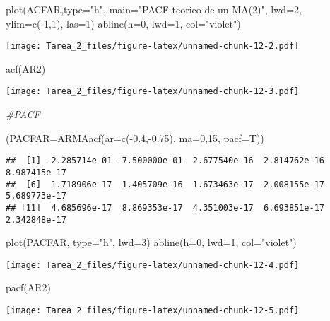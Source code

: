 \documentclass[
]{article}
\newenvironment{Shaded}{\begin{snugshade}}{\end{snugshade}}
\newcommand{\AttributeTok}[1]{\textcolor[rgb]{0.77,0.63,0.00}{#1}}
\newcommand{\CommentTok}[1]{\textcolor[rgb]{0.56,0.35,0.01}{\textit{#1}}}
\newcommand{\DecValTok}[1]{\textcolor[rgb]{0.00,0.00,0.81}{#1}}
\newcommand{\FloatTok}[1]{\textcolor[rgb]{0.00,0.00,0.81}{#1}}
\newcommand{\FunctionTok}[1]{\textcolor[rgb]{0.00,0.00,0.00}{#1}}
\newcommand{\NormalTok}[1]{#1}
\newcommand{\SpecialCharTok}[1]{\textcolor[rgb]{0.00,0.00,0.00}{#1}}
\newcommand{\StringTok}[1]{\textcolor[rgb]{0.31,0.60,0.02}{#1}}
\begin{document}
\begin{Shaded}
\begin{Highlighting}[]
\FunctionTok{plot}\NormalTok{(ACFAR,}\AttributeTok{type=}\StringTok{"h"}\NormalTok{, }\AttributeTok{main=}\StringTok{"PACF teorico de un MA(2)"}\NormalTok{, }\AttributeTok{lwd=}\DecValTok{2}\NormalTok{, }\AttributeTok{ylim=}\FunctionTok{c}\NormalTok{(}\SpecialCharTok{{-}}\DecValTok{1}\NormalTok{,}\DecValTok{1}\NormalTok{), }\AttributeTok{las=}\DecValTok{1}\NormalTok{)}
\FunctionTok{abline}\NormalTok{(}\AttributeTok{h=}\DecValTok{0}\NormalTok{, }\AttributeTok{lwd=}\DecValTok{1}\NormalTok{, }\AttributeTok{col=}\StringTok{"violet"}\NormalTok{)}
\end{Highlighting}
\end{Shaded}

\texttt{[image: Tarea\_2\_files/figure-latex/unnamed-chunk-12-2.pdf]}

\begin{Shaded}
\begin{Highlighting}[]
\FunctionTok{acf}\NormalTok{(AR2)}
\end{Highlighting}
\end{Shaded}

\texttt{[image: Tarea\_2\_files/figure-latex/unnamed-chunk-12-3.pdf]}

\begin{Shaded}
\begin{Highlighting}[]
\CommentTok{\#PACF}

\NormalTok{(}\AttributeTok{PACFAR=}\FunctionTok{ARMAacf}\NormalTok{(}\AttributeTok{ar=}\FunctionTok{c}\NormalTok{(}\SpecialCharTok{{-}}\FloatTok{0.4}\NormalTok{,}\SpecialCharTok{{-}}\FloatTok{0.75}\NormalTok{), }\AttributeTok{ma=}\DecValTok{0}\NormalTok{,}\DecValTok{15}\NormalTok{, }\AttributeTok{pacf=}\NormalTok{T))}
\end{Highlighting}
\end{Shaded}

\begin{verbatim}
##  [1] -2.285714e-01 -7.500000e-01  2.677540e-16  2.814762e-16  8.987415e-17
##  [6]  1.718906e-17  1.405709e-16  1.673463e-17  2.008155e-17  5.689773e-17
## [11]  4.685696e-17  8.869353e-17  4.351003e-17  6.693851e-17  2.342848e-17
\end{verbatim}

\begin{Shaded}
\begin{Highlighting}[]
\FunctionTok{plot}\NormalTok{(PACFAR, }\AttributeTok{type=}\StringTok{"h"}\NormalTok{, }\AttributeTok{lwd=}\DecValTok{3}\NormalTok{)}
\FunctionTok{abline}\NormalTok{(}\AttributeTok{h=}\DecValTok{0}\NormalTok{, }\AttributeTok{lwd=}\DecValTok{1}\NormalTok{, }\AttributeTok{col=}\StringTok{"violet"}\NormalTok{)}
\end{Highlighting}
\end{Shaded}

\texttt{[image: Tarea\_2\_files/figure-latex/unnamed-chunk-12-4.pdf]}

\begin{Shaded}
\begin{Highlighting}[]
\FunctionTok{pacf}\NormalTok{(AR2)}
\end{Highlighting}
\end{Shaded}

\texttt{[image: Tarea\_2\_files/figure-latex/unnamed-chunk-12-5.pdf]}
\end{document}
